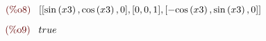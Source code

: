 \noindent
\begin{math}\displaystyle
\parbox{8ex}{\color{labelcolor}(\%o8) }
[[\mathrm{sin}\left( x3\right) ,\mathrm{cos}\left( x3\right) ,0],[0,0,1],[-\mathrm{cos}\left( x3\right) ,\mathrm{sin}\left( x3\right) ,0]]
\end{math}

\noindent
\begin{math}\displaystyle
\parbox{8ex}{\color{labelcolor}(\%o9) }
true
\end{math}
